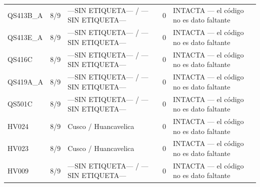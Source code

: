 \begin{longtable}{lllrl}
QS413B\_A & 8/9 & —SIN ETIQUETA— / —SIN ETIQUETA— & 0 & INTACTA — el código no es dato faltante \\
QS413E\_A & 8/9 & —SIN ETIQUETA— / —SIN ETIQUETA— & 0 & INTACTA — el código no es dato faltante \\
QS416C & 8/9 & —SIN ETIQUETA— / —SIN ETIQUETA— & 0 & INTACTA — el código no es dato faltante \\
QS419A\_A & 8/9 & —SIN ETIQUETA— / —SIN ETIQUETA— & 0 & INTACTA — el código no es dato faltante \\
QS501C & 8/9 & —SIN ETIQUETA— / —SIN ETIQUETA— & 0 & INTACTA — el código no es dato faltante \\
HV024 & 8/9 & Cusco / Huancavelica & 0 & INTACTA — el código no es dato faltante \\
HV023 & 8/9 & Cusco / Huancavelica & 0 & INTACTA — el código no es dato faltante \\
HV009 & 8/9 & —SIN ETIQUETA— / —SIN ETIQUETA— & 0 & INTACTA — el código no es dato faltante \\
\end{longtable}
